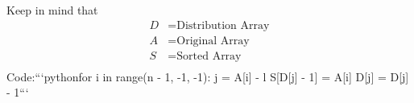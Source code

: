\documentclass[preview]{standalone}
\begin{document}
\begin{center}
Keep in mind that\begin{align*}D & = \text{Distribution Array} \\A & = \text{Original Array} \\S & = \text{Sorted Array} \\\end{align*}Code:```pythonfor i in range(n - 1, -1, -1):    j = A[i] - l    S[D[j] - 1] = A[i]    D[j] = D[j] - 1```\vrule
\end{center}
\end{document}
